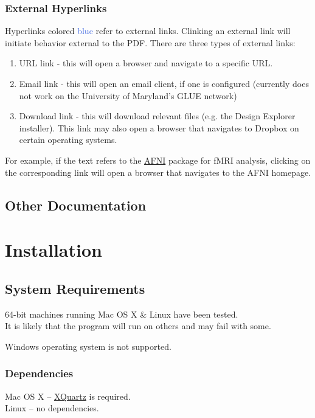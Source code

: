 \documentclass[10pt]{article}
\begin{document}
		\subsubsection{External Hyperlinks}
		\label{subsubsec:external}
			Hyperlinks colored \textcolor{RoyalBlue}{blue} refer to external links.
			Clinking an external link will initiate behavior external to the PDF.
			There are three types of external links:
			\begin{enumerate}
				\item URL link - this will open a browser and navigate to a specific URL.
				\item Email link - this will open an email client, if one is configured (currently does not work on the University of Maryland's GLUE network)
				\item Download link - this will download relevant files (e.g. the Design Explorer installer).
				This link may also open a browser that navigates to Dropbox on certain operating systems.
			\end{enumerate}
			For example, if the text refers to the \href{https://afni.nimh.nih.gov}{AFNI} package for fMRI analysis, clicking on the corresponding link will open a browser that navigates to the AFNI homepage.

	\subsection{Other Documentation}
	\label{subsec:intro.other}
\newpage

\section{Installation}
\label{sec:install}

	\subsection{System Requirements}
	\label{subsec:reqs}
		64-bit machines running Mac OS X \& Linux have been tested. \\
		It is likely that the program will run on others and may fail with some.

		Windows operating system is not supported.

		\subsubsection{Dependencies}
		\label{subsubsec:depend}
			Mac OS X -- \href{https://www.xquartz.org}{XQuartz} is required. \\
			Linux -- no dependencies.
\end{document}
